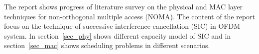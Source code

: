 The report shows progress of literature survey on the physical and
MAC layer techniques for non-orthogonal multiple access (NOMA).
The content of the report focus on the technique of
successive interference cancellation (SIC) in OFDM
system. In section~\ref{sec_phy} shows different capacity 
model of SIC and in section~\ref{sec_mac} shows
scheduling problems in different scenarios.
